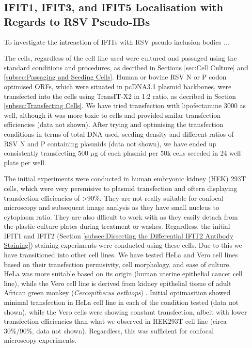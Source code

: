 \subsection{IFIT1, IFIT3, and IFIT5 Localisation with Regards to RSV Pseudo-IBs} \label{subsec:IFIT1, IFIT3, and IFIT5 Localisation with Regards to RSV Pseudo-IBs}


To investigate the intreaction of IFITs with RSV pseudo inclusion bodies ...

The cells, regardless of the cell line used were cultured and passaged using the standard conditions and procedures, as decribed in Sections \ref{sec:Cell Culture} and \ref{subsec:Passaging and Seeding Cells}. Human or bovine RSV N or P codon optimised ORFs, which were situated in pcDNA3.1 plasmid backbones, were transfected into the cells using TransIT-X2 in 1:2 ratio, as decribed in Section \ref{subsec:Transfecting Cells}. We have tried transfection with lipofectamine 3000 as well, although it was more toxic to cells and provided smilar transfection efficiencies (data not shown). After trying and optimising the transfection conditions in terms of total DNA used, seeding density and different ratios of RSV N and P containing plasmids (data not shown), we have ended up consistently transfecting 500 $\mu$g of each plasmid per 50k cells seeeded in 24 well plate per well.

The initial experiments were conducted in human embryonic kidney (HEK) 293T cells, which were very persmisive to plasmid transfection and oftern displaying transfection efficiencies of >90\%. They are not really suitable for confocal microscopy and subsequent image analysis as they have small nucleus to cytoplasm ratio. They are also dfficult to work with as they easily detach from the plastic culture plates during treatment or washes. Regardless, the initial IFIT1 and IFIT2 (Section \ref{subsec:Dissecting the Differential IFIT2 Antibody Staining}) staining experiments were conducted using these cells. Due to this we have transitioned into other cell lines. We have tested HeLa and Vero cell lines based on their transfection permisivity, cell morphology, and ease of culture. HeLa was more suitable based on its origin (human uterine epithelial cancer cell line), while the Vero cell line is derived from kidney epithelial tissue of adult African green monkey (\textit{Cercopithecus aethiops}) \cite{Simizu1967CharacterizationVero}. Initial optimasition showed minimal transfection in HeLa cell line in each of the condition tested (data not shown), while the Vero cells were showing constant transfection, albeit with lower transfection efficiencies than what we observed in HEK293T cell line (circa 30\%/90\%, data not shown). Regardless, this was sufficient for confocal microscopy experiments.

